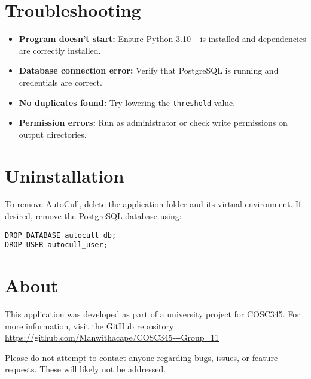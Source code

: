 \documentclass[12pt,a4paper]{article}
\begin{document}
\section{Troubleshooting}

\begin{itemize}
    \item \textbf{Program doesn’t start:}  
      Ensure Python 3.10+ is installed and dependencies are correctly installed.

    \item \textbf{Database connection error:}  
      Verify that PostgreSQL is running and credentials are correct.

    \item \textbf{No duplicates found:}  
      Try lowering the \texttt{threshold} value.

    \item \textbf{Permission errors:}  
      Run as administrator or check write permissions on output directories.
\end{itemize}


\section{Uninstallation}

To remove AutoCull, delete the application folder and its virtual environment.  
If desired, remove the PostgreSQL database using:

\begin{lstlisting}[style=console]
DROP DATABASE autocull_db;
DROP USER autocull_user;
\end{lstlisting}


\section{About}

This application was developed as part of a university project for COSC345. For more information, visit the GitHub repository: \url{https://github.com/Manwithacape/COSC345---Group_11}

Please do not attempt to contact anyone regarding bugs, issues, or feature requests. These will likely not be addressed.
\end{document}
